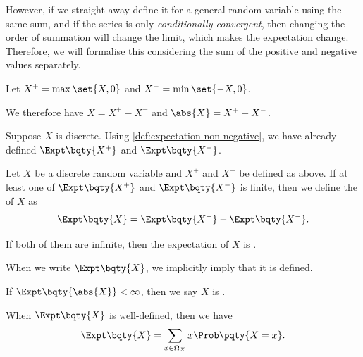 However, if we straight-away define it for a general random variable using the same sum, and if the series is only \emph{conditionally convergent}, then changing the order of summation will change the limit, which makes the expectation change. Therefore, we will formalise this considering the sum of the positive and negative values separately.

Let \(X^+ = \max\set{X, 0}\) and \(X^- = \min\set{-X, 0}\).

We therefore have \(X = X^+ - X^-\) and \(\abs{X} = X^+ + X^-\).

Suppose \(X\) is discrete. Using \autoref{def:expectation-non-negative}, we have already defined \(\Expt\bqty{X^+}\) and \(\Expt\bqty{X^-}\).

\begin{definition}
    \label{def:expectation-general-random-variable}%
    Let \(X\) be a discrete random variable and \(X^+\) and \(X^-\) be defined as above. If at least one of \(\Expt\bqty{X^+}\) and \(\Expt\bqty{X^-}\) is finite, then we define the  of \(X\) as
    \[
        \Expt\bqty{X} = \Expt\bqty{X^+} - \Expt\bqty{X^-}.
    \]

    If both of them are infinite, then the expectation of \(X\) is .
\end{definition}

When we write \(\Expt\bqty{X}\), we implicitly imply that it is defined.

\begin{definition}
    \label{def:integrability-random-variable}%
    If \(\Expt\bqty{\abs{X}} < \infty\), then we say \(X\) is .
\end{definition}

When \(\Expt\bqty{X}\) is well-defined, then we have
\[
    \Expt\bqty{X} = \sum_{x \in \Omega_X} x \Prob\pqty{X = x}.
\]

